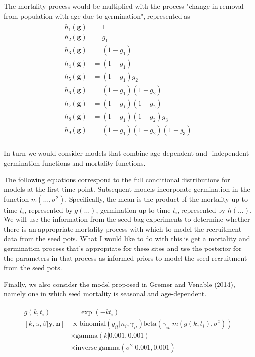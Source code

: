 \documentclass[12pt, oneside, titlepage]{article}   	%
\begin{document}
The mortality process would be multiplied with the process "change in removal from population with age due to germination", represented as
%
\begin{align}
  \begin{split}
h_1(\bm{g}) & = 1 \\
h_2(\bm{g}) & = g_1 \\
h_3(\bm{g}) & = (1-g_1) \\
h_4(\bm{g}) & = (1-g_1) \\
h_5(\bm{g}) & = (1-g_1) g_2 \\
h_6(\bm{g}) & = (1-g_1) (1- g_2) \\
h_7(\bm{g}) & = (1-g_1) (1- g_2) \\
h_8(\bm{g}) & = (1-g_1) (1- g_2) g_3 \\
h_9(\bm{g}) & = (1-g_1) (1- g_2) (1-g_3) \\
  \end{split}
\end{align}
% 

In turn we would consider models that combine age-dependent and -independent germination functions and mortality functions. 
\doublespace

The following equations correspond to the full conditional distributions for models at the first time point. Subsequent models incorporate germination in the function $m(\dots,\sigma^2)$. Specifically, the mean is the product of the mortality up to time $t_i$, represented by $g(\dots)$, germination up to time $t_i$, represented by $h(\dots)$. We will use the information from the seed bag experiments to determine whether there is an appropriate mortality process with which to model the recruitment data from the seed pots. What I would like to do with this is get a mortality and germination process that's appropriate for these sites and use the posterior for the parameters in that process as informed priors to model the seed recruitment from the seed pots. 


Finally, we also consider the model proposed in Gremer and Venable (2014), namely one in which seed mortality is seasonal and age-dependent. 

\begin{align}
  \begin{split}
  g(k,t_i) & = \exp(-k t_i) \\
[ k , \alpha, \beta | \bm{y}, \bm{n} ] & \propto \mathrm{binomial}(y_{it} | n_i, \gamma_{it}) \mathrm{beta}(\gamma _{it}| m(g(k, t_i ), \sigma^2) ) 
%
\\ & \times \mathrm{gamma}( k | 0.001, 0.001) 
\\ & \times \mathrm{inverse\ gamma}( \sigma^2 | 0.001, 0.001) 
  \end{split}
\end{align}
\end{document}
